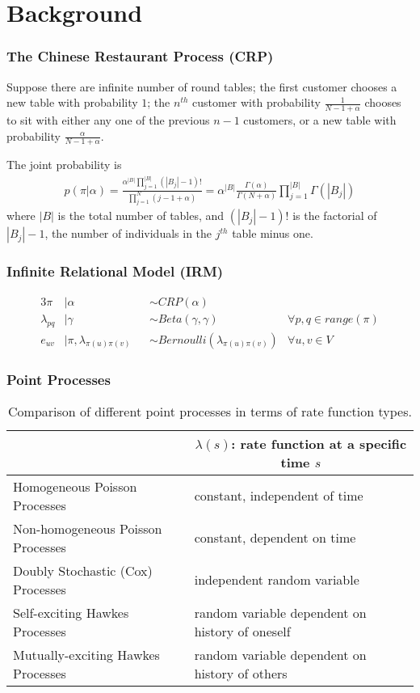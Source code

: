 \documentclass{beamer}
\begin{document}
\section{Background}

\begin{frame}
\frametitle{The Chinese Restaurant Process (CRP)}
Suppose there are infinite number of round tables; the first customer chooses a new table with probability $1$; the $n^{th}$ customer with probability $\frac{1}{N-1+\alpha}$ chooses to sit with either any one of the previous $n-1$ customers, or a new table with probability $\frac{\alpha}{N-1+\alpha}$.

The joint probability is
\begin{align}
  p(\pi | \alpha) = \frac{\alpha^{|B|} \prod_{j=1}^{|B|} (|B_j|-1)!}{\prod_{j=1}^N (j-1+\alpha)} = \alpha^{|B|} \frac{\Gamma(\alpha)}{\Gamma(N+\alpha)} \prod_{j=1}^{|B|} \Gamma(|B_j|)
\end{align}
where $|B|$ is the total number of tables, and $(|B_j|-1)!$ is the factorial of $|B_j|-1$, the number of individuals in the $j^{th}$ table minus one.
\end{frame}


\begin{frame}
\frametitle{Infinite Relational Model (IRM)}
\begin{alignat}{3}
	\pi &| \alpha & &\sim CRP(\alpha)\\
	\lambda_{pq} &| \gamma & &\sim Beta(\gamma,\gamma) &\forall p,q \in range(\pi)\\
	e_{uv} &| \pi,\lambda_{\pi(u)\pi(v)} & &\sim Bernoulli(\lambda_{\pi(u)\pi(v)}) &\forall u,v \in V
\end{alignat}
\end{frame}


\begin{frame}
\frametitle{Point Processes}
\fontsize{6pt}{12}\selectfont
\begin{table}[ht]
\centering
    \begin{tabular}{| l | l |} \hline
    & \multicolumn{1}{|c|}{$\lambda(s)$: rate function at a specific time $s$}\\ \hline
    Homogeneous Poisson Processes & constant, independent of time \\ \hline
    Non-homogeneous Poisson Processes & constant, dependent on time \\ \hline
    Doubly Stochastic (Cox) Processes & independent random variable \\ \hline
    Self-exciting Hawkes Processes & random variable dependent on history of oneself\\ \hline
    Mutually-exciting Hawkes Processes & random variable dependent on history of others \\
    \hline    
    \end{tabular}
    \caption{Comparison of different point processes in terms of rate function types.}
\end{table}
\end{frame}
\end{document}
